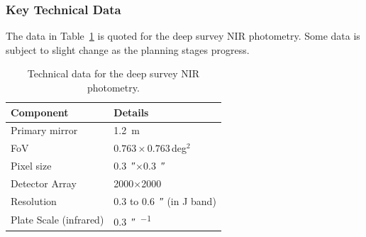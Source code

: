 	\subsubsection{Key Technical Data} %
	\label{ssub:key_technical_data}
		The data in Table~\ref{tab:Euclid_technical} is quoted for the deep survey NIR photometry. Some data is subject to slight change as the planning stages progress.
		\begin{table}[!htbp]
			\begin{center}
				\begin{tabular}{l|l}
					Component & Details \\
					\hline\hline
					Primary mirror		& \SI{1.2}{\metre} \\ \hline
					FoV 				& $0.763\times0.763$\,deg$^2$ \\ \hline
					Pixel size			& \SI{0.3}{\arcsecond}$\times$\SI{0.3}{\arcsecond} \\ \hline
					Detector Array		& \num{2000}$\times$\num{2000}\,\si{\pixel} \\ \hline
					Resolution 			& 0.3 to \SI{0.6}{\arcsecond} (in J band) \\ \hline
					Plate Scale (infrared)	& \SI{0.3}{\arcsecond\per\pixel}
				\end{tabular}
			\end{center}
			\caption{Technical data for the deep survey NIR photometry\cite{Euclid_Definition_Study_Report}.\label{tab:Euclid_technical}}
		\end{table}
